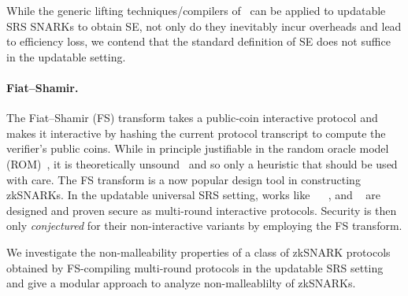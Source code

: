 While the generic lifting techniques/compilers of~\cite{EPRINT:KZMQCP15,CCS:AbdRamSla20} can be applied to updatable SRS SNARKs to obtain SE, not only do they inevitably incur overheads and lead to efficiency loss, we contend that the standard definition of SE does not suffice in the updatable setting.


\paragraph{Fiat--Shamir.}
The Fiat--Shamir (FS) transform takes a public-coin interactive protocol and
makes it interactive by hashing the current protocol transcript to compute the
verifier's public coins. While in principle justifiable in the random oracle
model (ROM)~\cite{CCS:BelRog93}, it is theoretically
unsound~\cite{FOCS:GolKal03} and so only a heuristic that should be used with
care.
%
The FS transform is a now popular design tool in constructing
zkSNARKs. In the updatable universal SRS setting, works like \sonic{}~\cite{CCS:MBKM19}
\plonk{}~\cite{EPRINT:GabWilCio19}, and \marlin~\cite{EC:CHMMVW20} are designed
and proven secure as multi-round interactive protocols. Security is then only
\emph{conjectured} for their non-interactive variants by employing the FS
transform.

We investigate the non-malleability properties of a class of zkSNARK protocols obtained by FS-compiling multi-round protocols in the updatable SRS setting and give a modular approach to analyze non-malleablilty of zkSNARKs.

